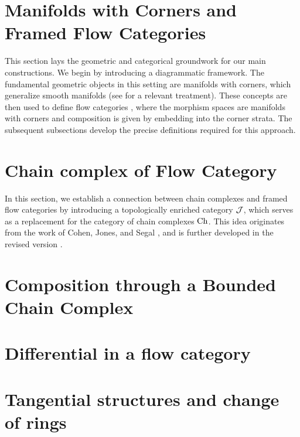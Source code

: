 \documentclass[a4paper,11pt]{article}
\theoremstyle{plain}
\theoremstyle{definition}
\theoremstyle{remark}
\begin{document}
\section{Manifolds with Corners and Framed Flow Categories}
This section lays the geometric and categorical groundwork for our main constructions. We begin by introducing a diagrammatic framework. The fundamental geometric objects in this setting are manifolds with corners, which generalize smooth manifolds (see \cite{LS14} for a relevant treatment). These concepts are then used to define flow categories \cite{CJS95}, where the morphism spaces are manifolds with corners and composition is given by embedding into the corner strata. The subsequent subsections develop the precise definitions required for this approach.


\section{Chain complex of Flow Category}\label{sec:J}
In this section, we establish a connection between chain complexes and framed flow categories by introducing a topologically enriched category $\mathcal{J}$, which serves as a replacement for the category of chain complexes $\operatorname{Ch}$. This idea originates from the work of Cohen, Jones, and Segal \cite{CJS95}, and is further developed in the revised version \cite{Cohen19}.



\section{Composition through a Bounded Chain Complex}\label{sec:compOfFlow}



\section{Differential in a flow category}




\newpage
\section{Tangential structures and change of rings} \label{sec:tangStr}



\appendix

\newpage
\printbibliography
\end{document}
